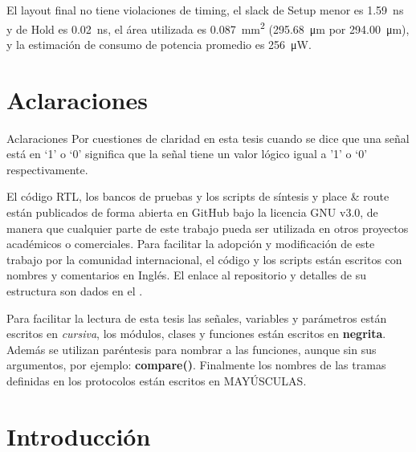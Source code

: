 \documentclass[a4paper, twoside, 11pt]{report}
\begin{document}
El layout final no tiene violaciones de timing, el slack de Setup menor es \SI{1,59}{\nano\second} y de Hold es \SI{0,02}{\nano\second}, el área utilizada es \SI{0,087}{\milli\meter\squared} (\SI{295,68}{\micro\meter} por \SI{294,00}{\micro\meter}), y la estimación de consumo de potencia promedio es \SI{256}{\micro\watt}.


\FloatBarrier
\chapter*{Aclaraciones}

Aclaraciones
Por cuestiones de claridad en esta tesis cuando se dice que una señal está en ‘1’ o ‘0’ significa que la señal tiene un valor lógico igual a '1' o ‘0’ respectivamente.

El código RTL, los bancos de pruebas y los scripts de síntesis y place \& route están publicados de forma abierta en GitHub bajo la licencia GNU v3.0, de manera que cualquier parte de este trabajo pueda ser utilizada en otros proyectos académicos o comerciales. Para facilitar la adopción y modificación de este trabajo por la comunidad internacional, el código y los scripts están escritos con nombres y comentarios en Inglés. El enlace al repositorio y detalles de su estructura son dados en el .

Para facilitar la lectura de esta tesis las señales, variables y parámetros están escritos en \textit{cursiva},  los módulos, clases y funciones están escritos en \textbf{negrita}. Además se utilizan paréntesis para nombrar a las funciones, aunque sin sus argumentos, por ejemplo: \textbf{compare()}. Finalmente los nombres de las tramas definidas en los protocolos están escritos en MAYÚSCULAS.

\newpage
\tableofcontents


\FloatBarrier
\chapter{Introducción}
\end{document}
